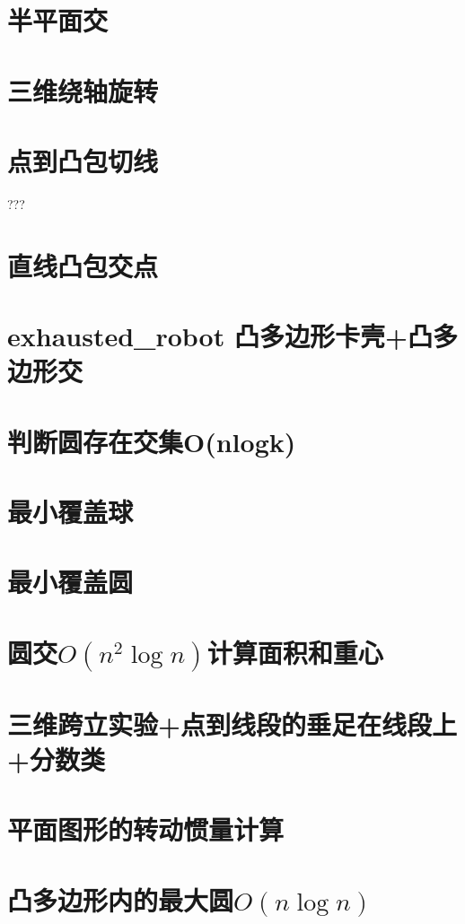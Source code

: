 \documentclass[a4paper,10pt]{book}
\begin{document}
	\section{半平面交}
		
	\section{三维绕轴旋转}
		
	\section{点到凸包切线}???
	\section{直线凸包交点}
		
	\section{exhausted\_robot 凸多边形卡壳+凸多边形交}
		
	\section{判断圆存在交集O(nlogk)}
		
	\section{最小覆盖球}
		
	\section{最小覆盖圆}
		
	\section{圆交$O(n^2\log n)$计算面积和重心}
		
	\section{三维跨立实验+点到线段的垂足在线段上+分数类}
		
	\section{平面图形的转动惯量计算}
		
	\section{凸多边形内的最大圆$O(n\log n)$}
		
\end{document}
